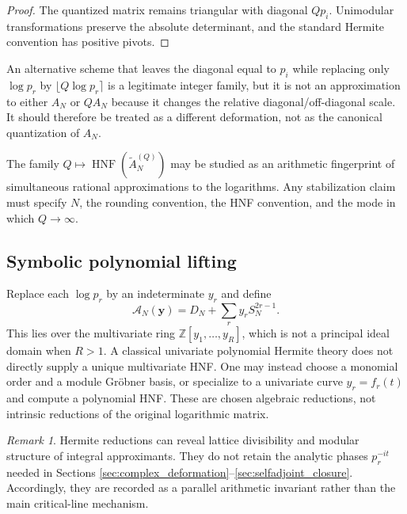 \documentclass[11pt]{amsart}
\numberwithin{equation}{section}
\theoremstyle{plain}
\theoremstyle{definition}
\theoremstyle{remark}
\newtheorem{remark}[theorem]{Remark}
\newcommand{\Z}{\mathbb Z}
\begin{document}
\begin{proof}
The quantized matrix remains triangular with diagonal $Qp_i$.  Unimodular transformations preserve the absolute determinant, and the standard Hermite convention has positive pivots.
\end{proof}

An alternative scheme that leaves the diagonal equal to $p_i$ while replacing only $\log p_r$ by $\lfloor Q\log p_r\rceil$ is a legitimate integer family, but it is not an approximation to either $A_N$ or $QA_N$ because it changes the relative diagonal/off-diagonal scale.  It should therefore be treated as a different deformation, not as the canonical quantization of $A_N$.

The family $Q\mapsto\operatorname{HNF}(\widetilde A_N^{(Q)})$ may be studied as an arithmetic fingerprint of simultaneous rational approximations to the logarithms.  Any stabilization claim must specify $N$, the rounding convention, the HNF convention, and the mode in which $Q\to\infty$.

\subsection{Symbolic polynomial lifting}
\label{subsec:symbolic_hermite}

Replace each $\log p_r$ by an indeterminate $y_r$ and define
\begin{equation}
\mathcal A_N(\mathbf y)=D_N+\sum_ry_rS_N^{2r-1}.
\label{eq:symbolic_A}
\end{equation}
This lies over the multivariate ring $\Z[y_1,\ldots,y_R]$, which is not a principal ideal domain when $R>1$.  A classical univariate polynomial Hermite theory does not directly supply a unique multivariate HNF.  One may instead choose a monomial order and a module Gr\"obner basis, or specialize to a univariate curve $y_r=f_r(t)$ and compute a polynomial HNF.  These are chosen algebraic reductions, not intrinsic reductions of the original logarithmic matrix.

\begin{remark}
\label{rem:hermite_role}
Hermite reductions can reveal lattice divisibility and modular structure of integral approximants.  They do not retain the analytic phases $p_r^{-it}$ needed in Sections \ref{sec:complex_deformation}--\ref{sec:selfadjoint_closure}.  Accordingly, they are recorded as a parallel arithmetic invariant rather than the main critical-line mechanism.
\end{remark}
\end{document}
